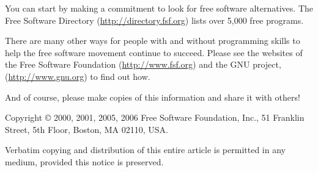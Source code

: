 \documentclass[twoside,12pt]{article}
\begin{document}
You can start by making a commitment to look for free software alternatives.
The Free Software Directory (\url{http://directory.fsf.org}) lists over 5,000 free
programs.

There are many other ways for people with and without programming skills to
help the free software movement continue to succeed. Please see the websites of
the Free Software Foundation (\url{http://www.fsf.org}) and the GNU project,
(\url{http://www.gnu.org}) to find out how.

And of course, please make copies of this information and share it with
others!

\vspace{0.3in}

{\small

\noindent Copyright \copyright\/ 2000, 2001, 2005, 2006 Free Software Foundation, Inc., 51
Franklin Street, 5th Floor, Boston, MA 02110, USA.

Verbatim copying and distribution of this entire article is permitted
in any medium, provided this notice is preserved.
}
\end{document}
